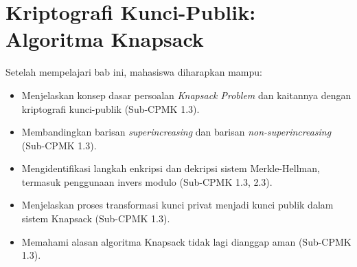 \documentclass[../../main.tex]{subfiles}
\begin{document}
\chapter{Kriptografi Kunci-Publik: Algoritma Knapsack}
\label{chap:knapsack}

\begin{learningoutcome}
Setelah mempelajari bab ini, mahasiswa diharapkan mampu:
\begin{itemize}
    \item Menjelaskan konsep dasar persoalan \textit{Knapsack Problem} dan kaitannya dengan kriptografi kunci-publik (Sub-CPMK 1.3).
    \item Membandingkan barisan \textit{superincreasing} dan barisan \textit{non-superincreasing} (Sub-CPMK 1.3).
    \item Mengidentifikasi langkah enkripsi dan dekripsi sistem Merkle-Hellman, termasuk penggunaan invers modulo (Sub-CPMK 1.3, 2.3).
    \item Menjelaskan proses transformasi kunci privat menjadi kunci publik dalam sistem Knapsack (Sub-CPMK 1.3).
    \item Memahami alasan algoritma Knapsack tidak lagi dianggap aman (Sub-CPMK 1.3).
\end{itemize}
\end{learningoutcome}










\end{document}
